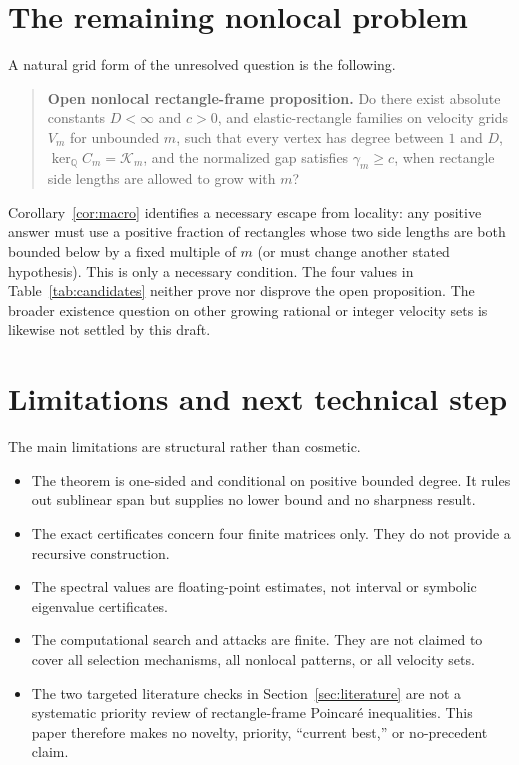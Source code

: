 \documentclass[11pt]{article}
\theoremstyle{definition}
\theoremstyle{remark}
\begin{document}
\section{The remaining nonlocal problem}\label{sec:open}

A natural grid form of the unresolved question is the following.

\begin{quote}
\textbf{Open nonlocal rectangle-frame proposition.}
Do there exist absolute constants $D<\infty$ and $c>0$, and elastic-rectangle
families on velocity grids $V_m$ for unbounded $m$, such that every vertex has
degree between $1$ and $D$,
$\ker_{\mathbb Q}C_m=\mathcal K_m$, and the normalized gap satisfies
$\gamma_m\geq c$, when rectangle side lengths are allowed to grow with $m$?
\end{quote}

Corollary~\ref{cor:macro} identifies a necessary escape from locality: any
positive answer must use a positive fraction of rectangles whose two side
lengths are both bounded below by a fixed multiple of $m$ (or must change
another stated hypothesis).  This is only a necessary condition.
The four values in Table~\ref{tab:candidates} neither prove nor disprove the
open proposition.  The broader existence question on other growing rational
or integer velocity sets is likewise not settled by this draft.

\section{Limitations and next technical step}\label{sec:limits}

The main limitations are structural rather than cosmetic.
\begin{itemize}
\item The theorem is one-sided and conditional on positive bounded degree.  It
rules out sublinear span but supplies no lower bound and no sharpness result.
\item The exact certificates concern four finite matrices only.  They do not
provide a recursive construction.
\item The spectral values are floating-point estimates, not interval or
symbolic eigenvalue certificates.
\item The computational search and attacks are finite.  They are not claimed
to cover all selection mechanisms, all nonlocal patterns, or all velocity
sets.
\item The two targeted literature checks in Section~\ref{sec:literature} are
not a systematic priority review of rectangle-frame Poincar\'e inequalities.
This paper therefore makes no novelty, priority, ``current best,'' or
no-precedent claim.
\end{itemize}
\end{document}
